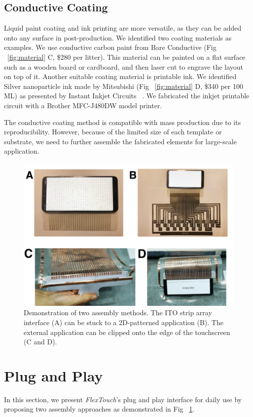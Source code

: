 \subsection{Conductive Coating}
Liquid paint coating and ink printing are more versatile, as they can be added onto any surface in post-production. We identified two coating materials as examples. We use conductive carbon paint from Bare Conductive (Fig ~\ref{fig:material} C, \$280 per litter).  This material can be painted on a flat surface such as a wooden board or cardboard, and then laser cut to engrave the layout on top of it. Another suitable coating material is printable ink. We identified Silver nanoparticle ink made by Mitsubishi (Fig ~\ref{fig:material} D, \$340 per 100 ML) as presented by Instant Inkjet Circuits ~\cite{Kawahara-inkjet}. We fabricated the inkjet printable circuit with a Brother MFC-J480DW model printer. 

The conductive coating method is compatible with mass production due to its reproducibility. However, because of the limited size of each template or substrate, we need to further assemble the fabricated elements for large-scale application.

\begin{figure}[ht]
  \centering
    \includegraphics[width=0.75\columnwidth]{figures/plugandplay.png}
    \setlength{\belowcaptionskip}{-6pt}
    \caption{Demonstration of two assembly methods. The ITO strip array interface (A) can be stuck to a 2D-patterned application (B). The external application can be clipped onto the edge of the touchscreen (C and D).}
    \label{fig:plugandplay}
\end{figure}

\section{Plug and Play}
In this section, we present \textit{FlexTouch}'s plug and play interface for daily use by proposing two assembly approaches as demonstrated in Fig ~\ref{fig:plugandplay}. 



